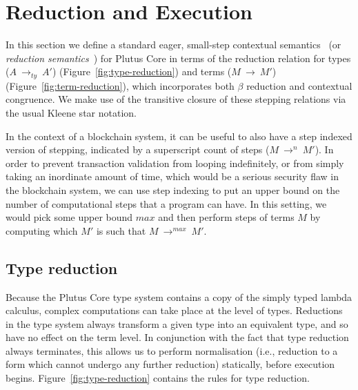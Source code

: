\documentclass[a4paper]{article}
\newcommand{\typeStep}[2]{#1 ~ \rightarrow_{ty} ~ #2}
\newcommand{\step}[2]{#1 ~ \rightarrow ~ #2}
\newcommand{\multistepIndexed}[3]{#1 ~ \rightarrow^{#2} ~ #3}
\begin{document}
\section{Reduction and Execution}
\label{sec:reduction}

In this section we define a standard eager,
small-step contextual semantics~\cite[5.3]{Harper:PFPL} (or
\textit{reduction semantics}~\cite[\S2]{Felleisen-Hieb}) for Plutus
Core in terms of the reduction relation for types
(\(\typeStep{A}{A'}\)) (Figure~\ref{fig:type-reduction}) 
and terms (\(\step{M}{M'}\)) (Figure~\ref{fig:term-reduction}), which
incorporates both $\beta$ reduction and contextual congruence. We make
use of the transitive closure of these stepping relations via the
usual Kleene star notation.

In the context of a blockchain system, it can be useful to also have a
step indexed version of stepping, indicated by a superscript count of
steps (\(\multistepIndexed{M}{n}{M'}\)). In order to prevent
transaction validation from looping indefinitely, or from simply
taking an inordinate amount of time, which would be a serious security
flaw in the blockchain system, we can use step indexing to put an
upper bound on the number of computational steps that a program can
have. In this setting, we would pick some upper bound $\mathit{max}$
and then perform steps of terms $M$ by computing which $M'$ is such
that \(\multistepIndexed{M}{\mathit{max}}{M'}\).


\newpage 

\subsection{Type reduction}
Because the Plutus Core type system contains a copy of the simply
typed lambda calculus, complex computations can take place at the
level of types.  Reductions in the type system always transform a
given type into an equivalent type, and so have no effect on the term
level.  In conjunction with the fact that type reduction always
terminates, this allows us to perform normalisation (i.e., reduction to
a form which cannot undergo any further reduction) statically, before
execution begins.  Figure~\ref{fig:type-reduction} contains the rules
for type reduction.


\end{document}
